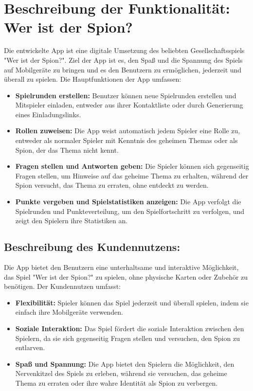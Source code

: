 \chapter{Beschreibung der Funktionalität: Wer ist der Spion?}
Die entwickelte App ist eine digitale Umsetzung des beliebten Gesellschaftsspiels "Wer ist der Spion?". Ziel der App ist es, den Spaß und die Spannung des Spiels auf Mobilgeräte zu bringen und es den Benutzern zu ermöglichen, jederzeit und überall zu spielen. Die Hauptfunktionen der App umfassen:

\begin{itemize}
    \item \textbf{Spielrunden erstellen:} Benutzer können neue Spielrunden erstellen und Mitspieler einladen, entweder aus ihrer Kontaktliste oder durch Generierung eines Einladungslinks.
    \item \textbf{Rollen zuweisen:} Die App weist automatisch jedem Spieler eine Rolle zu, entweder als normaler Spieler mit Kenntnis des geheimen Themas oder als Spion, der das Thema nicht kennt.
    \item \textbf{Fragen stellen und Antworten geben:} Die Spieler können sich gegenseitig Fragen stellen, um Hinweise auf das geheime Thema zu erhalten, während der Spion versucht, das Thema zu erraten, ohne entdeckt zu werden.
    \item \textbf{Punkte vergeben und Spielstatistiken anzeigen:} Die App verfolgt die Spielrunden und Punkteverteilung, um den Spielfortschritt zu verfolgen, und zeigt den Spielern ihre Statistiken an.
\end{itemize}

\section{Beschreibung des Kundennutzens:}

Die App bietet den Benutzern eine unterhaltsame und interaktive Möglichkeit, das Spiel "Wer ist der Spion?" zu spielen, ohne physische Karten oder Zubehör zu benötigen. Der Kundennutzen umfasst:

\begin{itemize}
    \item \textbf{Flexibilität:} Spieler können das Spiel jederzeit und überall spielen, indem sie einfach ihre Mobilgeräte verwenden.
    \item \textbf{Soziale Interaktion:} Das Spiel fördert die soziale Interaktion zwischen den Spielern, da sie sich gegenseitig Fragen stellen und versuchen, den Spion zu entlarven.
    \item \textbf{Spaß und Spannung:} Die App bietet den Spielern die Möglichkeit, den Nervenkitzel des Spiels zu erleben, während sie versuchen, das geheime Thema zu erraten oder ihre wahre Identität als Spion zu verbergen.
\end{itemize}



